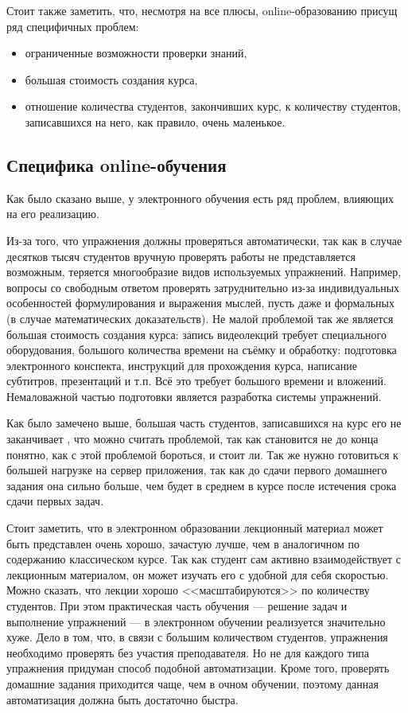 \documentclass{matmex-diploma-custom}
\begin{document}
Стоит также заметить, что, несмотря на все плюсы, online-образованию
присущ ряд специфичных проблем:
\begin{itemize}
\item ограниченные возможности проверки знаний,
\item большая стоимость создания курса,
\item отношение количества студентов, закончивших курс, к количеству
  студентов, записавшихся на него, как правило, очень маленькое.
\end{itemize}

\subsection*{Специфика online-обучения}
Как было сказано выше, у электронного обучения есть ряд проблем,
влияющих на его реализацию.

Из-за того, что упражнения должны проверяться автоматически, так как в
случае десятков тысяч студентов вручную проверять работы не
представляется возможным, теряется многообразие видов используемых
упражнений. Например, вопросы со свободным ответом проверять
затруднительно из-за индивидуальных особенностей формулирования и
выражения мыслей, пусть даже и формальных (в случае математических
доказательств).  Не малой проблемой так же является большая стоимость
создания курса: запись видеолекций требует специального оборудования,
большого количества времени на съёмку и обработку: подготовка
электронного конспекта, инструкций для прохождения курса, написание
субтитров, презентаций и т.п. Всё это требует большого времени и
вложений. Немаловажной частью подготовки является разработка системы
упражнений.

Как было замечено выше, большая часть студентов, записавшихся на курс
его не заканчивает \cite{Clow}, что можно считать проблемой, так как
становится не до конца понятно, как с этой проблемой бороться, и стоит
ли. Так же нужно готовиться к большей нагрузке на сервер приложения,
так как до сдачи первого домашнего задания она сильно больше, чем
будет в среднем в курсе после истечения срока сдачи первых задач.

Стоит заметить, что в электронном образовании лекционный материал
может быть представлен очень хорошо, зачастую лучше, чем в аналогичном
по содержанию классическом курсе. Так как студент сам активно
взаимодействует с лекционным материалом, он может изучать его с
удобной для себя скоростью. Можно сказать, что лекции хорошо
<<масштабируются>> по количеству студентов.  При этом практическая
часть обучения --- решение задач и выполнение упражнений --- в
электронном обучении реализуется значительно хуже.  Дело в том, что, в
связи с большим количеством студентов, упражнения необходимо проверять
без участия преподавателя. Но не для каждого типа упражнения придуман
способ подобной автоматизации. Кроме того, проверять домашние задания
приходится чаще, чем в очном обучении, поэтому данная автоматизация
должна быть достаточно быстра.
\end{document}
